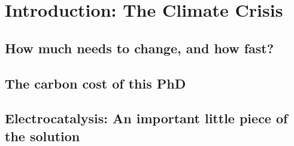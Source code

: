 
\chapter{Introduction: The Climate Crisis}

\section{How much needs to change, and how fast?}

\section{The carbon cost of this PhD}

\section{Electrocatalysis: An important little piece of the solution}